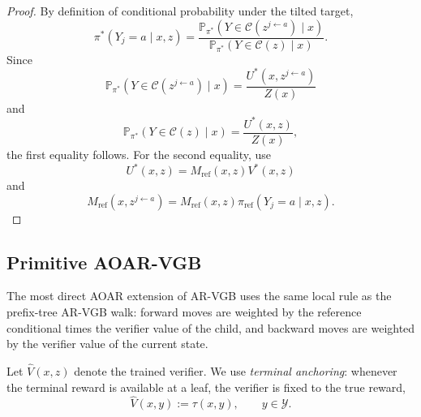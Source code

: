 \documentclass{article}
\numberwithin{theorem}{section}
\numberwithin{proposition}{section}
\numberwithin{corollary}{section}
\numberwithin{lemma}{section}
\numberwithin{conjecture}{section}
\numberwithin{remark}{section}
\numberwithin{definition}{section}
\numberwithin{assumption}{section}
\numberwithin{example}{section}
\newcommand{\calC}{{\mathcal{C}}}
\newcommand{\calY}{{\mathcal{Y}}}
\newcommand{\bbP}{\mathbb{P}}
\providecommand{\base}{\pi_{\mathrm{ref}}}
\begin{document}
\begin{proof}
By definition of conditional probability under the tilted target,
\begin{equation*}
    \pi^*(Y_j=a\mid x,z) = \frac{ \bbP_{\pi^*}(Y\in\calC(z^{j\leftarrow a})\mid x) }{ \bbP_{\pi^*}(Y\in\calC(z)\mid x) }.
\end{equation*}
Since
\begin{equation*}
    \bbP_{\pi^*}(Y\in\calC(z^{j\leftarrow a})\mid x) = \frac{U^*(x,z^{j\leftarrow a})}{Z(x)}
\end{equation*}
and
\begin{equation*}
    \bbP_{\pi^*}(Y\in\calC(z)\mid x) = \frac{U^*(x,z)}{Z(x)},
\end{equation*}
the first equality follows. For the second equality, use
\begin{equation*}
    U^*(x,z)=M_{\text{ref}}(x,z)V^*(x,z)
\end{equation*}
and
\begin{equation*}
    M_{\text{ref}}(x,z^{j\leftarrow a}) = M_{\text{ref}}(x,z) \base(Y_j=a\mid x,z).
\end{equation*}
\end{proof}

\subsection{Primitive AOAR-VGB}
\label{app:subsec:primitive_aoar_vgb}

The most direct AOAR extension of AR-VGB uses the same local rule as the prefix-tree AR-VGB walk: forward moves are weighted by the reference conditional times the verifier value of the child, and backward moves are weighted by the verifier value of the current state.

Let $\widehat V(x,z)$ denote the trained verifier. We use \emph{terminal anchoring}: whenever the terminal reward is available at a leaf, the verifier is fixed to the true reward,
\begin{equation*}
    \widehat V(x,y):=\tau(x,y), \qquad y\in\calY.
\end{equation*}
\end{document}
